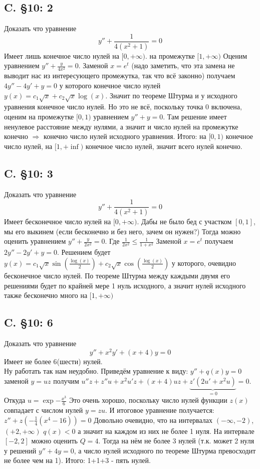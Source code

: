 \documentclass{article}
\begin{document}
\subsection{C. \S10: 2}
Доказать что уравнение 
\begin{equation}
    y''+\frac{1}{4(x^2+1)}=0
\end{equation}
Имеет лишь конечное число нулей на $[0,+\infty)$. на промежутке $[1,+\infty)$ Оценим уравнением $y''+\frac{y}{4 x^2}=0$. Заменой $x=e^t$ (надо заметить, что эта замена не выводит нас из интересующего промежутка, так что всё законно) получаем $4y''-4y'+y=0$ у которого конечное число нулей $y(x) = c_1 \sqrt x + c_2 \sqrt x \log(x)$. Значит по теореме Штурма и у исходного уравнения конечное число нулей. Но это не всё, поскольку точка 0 включена, оценим на промежутке $[0,1)$ уравнением 
$y''+y=0$. Там решение имеет ненулевое расстояние между нулями, а значит и число нулей на промежутке конечно $\Rightarrow$ конечно число нулей исходного уравнения. Итого: на $[0,1)$ конечное число нулей, на $[1,+\inf)$ конечное число нулей, значит всего нулей конечно.
\subsection{C. \S10: 3}
Доказать что уравнение 
\begin{equation}
    y''+\frac{1}{4(x^2+1)}=0
\end{equation}
Имеет бесконечное число нулей на $[0,+\infty)$. Дабы не было бед с участком $[0,1]$, мы его выкинем (если бесконечно и без него, зачем он нужен?) Тогда можно оценить уравнением $y''+\frac{y}{2x^2}=0$. Где $\frac{1}{2x^2} \leq \frac{1}{1+x^2}$ Заменой $x=e^t$ получаем $2y''-2y'+y=0$. Решением будет $y(x)=c_1 \sqrt{x} \sin \left(\frac{\log (x)}{2}\right)+c_2 \sqrt{x} \cos \left(\frac{\log (x)}{2}\right)$ у которого, очевидно бесконечное число нулей. По теореме Штурма между каждыми двумя его решениями будет по крайней мере 1 нуль исходного, а значит нулей исходного также бесконечно много на $[1,+\infty)$ 
\subsection{C. \S10: 6}
Доказать что уравнение 
\begin{equation}
    y''+x^2 y' +(x+4)y=0
\end{equation}
Имеет не более 6(шести) нулей.\\
Ну работать так нам неудобно. Приведём уравнение к виду: $y''+q(x)y=0$ заменой $y=u z$ получим $u''z+z''u+x^2u'z+(x+4) u z + \underbrace{z'(2u'+x^2u)}_{=0}=0$. Откуда $u=\exp{-\frac{x^3}{6}}$ Это очень хорошо, поскольку число нулей функции $z(x)$ совпадает с числом нулей $y=z u$. И итоговое уравнение получается: $z''+z(-\frac{1}{4} \left(x^4-16\right))=0$ Довольно очевидно, что на интервалах $(-\infty,-2)$, $(+2,+\infty)$ $q(x)<0$ а значит на каждом из них не более 1 нуля. На интервале $[-2,2]$ можно оценить $Q=4$. Тогда на нём не более 3 нулей (т.к. может 2  нуля у решений $y''+4y=0$, а число нулей исходного по теореме Штурма превосходит не более чем на 1). Итого: 1+1+3 - пять нулей.
\end{document}
